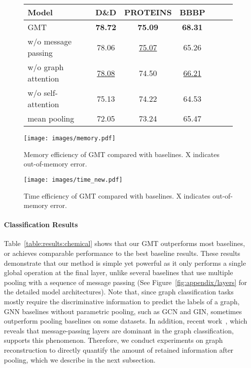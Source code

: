 \documentclass{article} \usepackage{iclr2021_conference,times}
\begin{document}
\begin{figure}[!t]
\begin{minipage}{0.35\linewidth}
{\begin{tabular}{lcccccc}
        \toprule
        {\bf Model} & \textbf{D\&D} & {\bf PROTEINS} & \textbf{BBBP} \\
        \midrule
        GMT     & \textbf{78.72} & \bf 75.09 & \bf 68.31\\
        \midrule
        w/o message passing & 78.06 & \underline{75.07} & 65.26 \\
        \midrule
        w/o graph attention & \underline{78.08} & 74.50 & \underline{66.21}\\
        w/o self-attention & 75.13 & 74.22 & 64.53\\
        mean pooling & 72.05 & 73.24 & 65.47\\
        \bottomrule
        \end{tabular}
        }
        \vskip -0.08in
        \label{ablation}
    \end{minipage}
    \hfill
    \begin{minipage}{0.3\linewidth}
        \centerline{\texttt{[image: images/memory.pdf]}}
        \vskip -0.17in
        \caption{\small Memory efficiency of GMT compared with baselines. X indicates out-of-memory error.}
        \label{memory}
    \end{minipage}
    \hfill
    \begin{minipage}{0.3\linewidth}
        \centerline{\texttt{[image: images/time\_new.pdf]}}
        \vskip -0.17in
        \caption{\small Time efficiency of GMT compared with baselines. X indicates out-of-memory error.}
        \label{time}
    \end{minipage}
    \vskip -0.175in
\end{figure}

 
\vspace{-0.03in}
\paragraph{Classification Results}
Table~\ref{table:results:chemical} shows that our GMT outperforms most baselines, or achieves comparable performance to the best baseline results. These results demonstrate that our method is simple yet powerful as it only performs a single global operation at the final layer, unlike several baselines that use multiple pooling with a sequence of message passing (See Figure~\ref{fig:appendix/layers} for the detailed model architectures). Note that, since graph classification tasks mostly require the discriminative information to predict the labels of a graph, GNN baselines without parametric pooling, such as GCN and GIN, sometimes outperform pooling baselines on some datasets. In addition, recent work~\citep{rethinking/pooling}, which reveals that message-passing layers are dominant in the graph classification, supports this phenomenon. Therefore, we conduct experiments on graph reconstruction to directly quantify the amount of retained information after pooling, which we describe in the next subsection.
\end{document}
